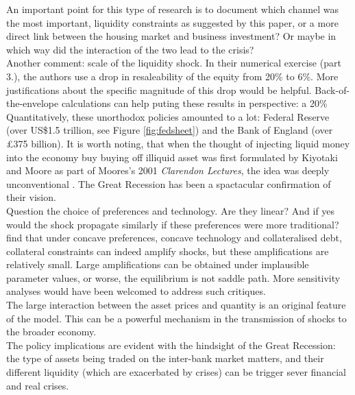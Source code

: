 \documentclass{amsart}
\theoremstyle{definition}
\theoremstyle{remark}
\numberwithin{equation}{section}
\begin{document}
An important point for this type of research is to document which channel was the most important, liquidity constraints as suggested by this paper, or a more direct link between the housing market and business investment? Or maybe in which way did the interaction of the two lead to the crisis?\\

Another comment: scale of the liquidity shock. In their numerical exercise (part 3.), the authors use a drop in resaleability of the equity from 20\% to 6\%. More justifications about the specific magnitude of this drop would be helpful. Back-of-the-envelope calculations can help puting these results in perspective: a 20\% \\

Quantitatively, these unorthodox policies amounted to a lot: Federal Reserve (over US\$1.5 trillion, see Figure \ref{fig:fedsheet}) and the Bank of England (over £375 billion). It is worth noting, that when the thought of injecting liquid money into the economy buy buying off illiquid asset was first formulated by Kiyotaki and Moore as part of Moores's 2001 \textit{Clarendon Lectures}, the idea was deeply unconventional \citep{kiyotaki2001liquidity}. The Great Recession has been a spactacular confirmation of their vision.\\

Question the choice of preferences and technology. Are they linear? And if yes would the shock propagate similarly if these preferences were more traditional? \cite{cordoba2004credit} find that under concave preferences, concave technology and collateralised debt, collateral constraints can indeed amplify shocks, but these amplifications are relatively small. Large amplifications can be obtained under implausible parameter values, or worse, the equilibrium is not saddle path. More sensitivity analyses would have been welcomed to address such critiques.\\

The large interaction between the asset prices and quantity is an original feature of the model. This can be a powerful mechanism in the transmission of shocks to the broader economy.\\

The policy implications are evident with the hindsight of the Great Recession: the type of assets being traded on the inter-bank market matters, and their different liquidity (which are exacerbated by crises) can be trigger sever financial and real crises.
\end{document}

